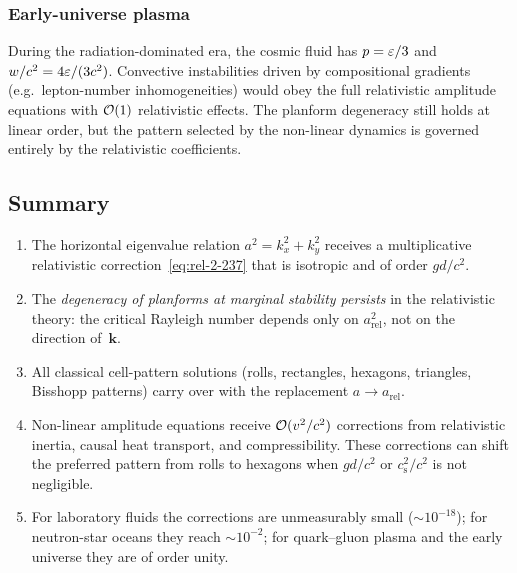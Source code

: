 \subsubsection*{Early-universe plasma}

During the radiation-dominated era, the cosmic fluid has
$p=\varepsilon/3$ and $w/c^{2}=4\varepsilon/(3c^{2})$.
Convective instabilities driven by compositional gradients (e.g.\
lepton-number inhomogeneities) would obey the full relativistic
amplitude equations with $\mathcal{O}(1)$ relativistic effects.  The
planform degeneracy still holds at linear order, but the pattern
selected by the non-linear dynamics is governed entirely by the
relativistic coefficients.

\subsection{Summary}\label{sec:rel-16-summary}

\begin{enumerate}
\item The horizontal eigenvalue relation
  $a^{2}=k_{x}^{2}+k_{y}^{2}$ receives a multiplicative
  relativistic correction~\eqref{eq:rel-2-237} that is isotropic
  and of order $gd/c^{2}$.
\item The \emph{degeneracy of planforms at marginal stability
  persists} in the relativistic theory: the critical Rayleigh number
  depends only on $a_{\mathrm{rel}}^{2}$, not on the direction
  of~$\mathbf{k}$.
\item All classical cell-pattern solutions (rolls, rectangles,
  hexagons, triangles, Bisshopp patterns) carry over with the
  replacement $a\to a_{\mathrm{rel}}$.
\item Non-linear amplitude equations receive $\mathcal{O}(v^{2}/c^{2})$
  corrections from relativistic inertia, causal heat transport,
  and compressibility.  These corrections can shift the preferred
  pattern from rolls to hexagons when $gd/c^{2}$ or
  $c_{\mathrm{s}}^{2}/c^{2}$ is not negligible.
\item For laboratory fluids the corrections are unmeasurably small
  ($\sim 10^{-18}$); for neutron-star oceans they reach
  $\sim 10^{-2}$; for quark--gluon plasma and the early universe
  they are of order unity.
\end{enumerate}

